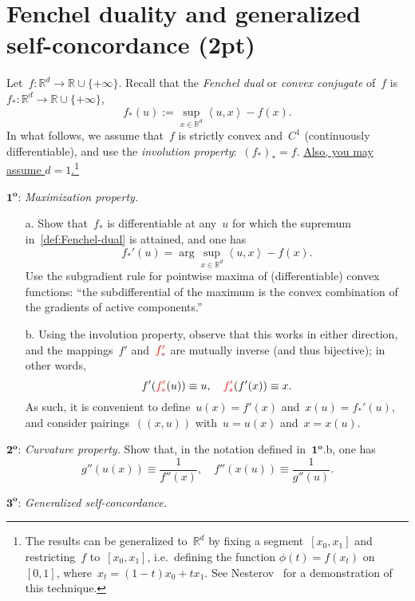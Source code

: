 \documentclass[11pt]{article}
\newcommand{\proofstep}[1]{$\boldsymbol{{#1}^o}$}
\newcommand{\odima}[1]{{\color{red} #1}}
\newcommand{\R}{\mathds{R}}
\newcommand{\lang}{\left\langle}
\newcommand{\rang}{\right\rangle}
\begin{document}
\section{Fenchel duality and generalized self-concordance (2pt)}
Let~$f: \R^d \to \R \cup \{+\infty\}$. 
Recall that the {\em Fenchel dual} or {\em convex conjugate} of~$f$ is~$f_*: \R^d \to \R \cup \{+\infty\}$,
\begin{equation}
\label{def:Fenchel-dual}
f_*(u) := \sup_{x \in \R^d} \lang u, x \rang - f(x).
\end{equation}
In what follows, we assume that~$f$ is \odima{strictly} convex \odima{and~$C^1$ (continuously differentiable)}, and use the {\em involution property}:~$(f_*)_* = f$. 
\underline{Also, you may assume $d = 1$.}\footnote{The results can be generalized to~$\R^d$ by fixing a segment~$[x_0, x_1]$ and restricting~$f$ to~$[x_0, x_1]$, i.e.~defining the function
$
\phi(t) = f(x_t)
$
on~$[0,1]$, where~$x_t = (1-t)x_0 + t x_1.$ See Nesterov~\cite{nesterov2013introductory} for a demonstration of this technique.}

\noindent
\proofstep{1}: {\em Maximization property.}
\begin{itemize}
\item[a.] Show that~$f_*$ is differentiable at any~$u$ for which the supremum in~\eqref{def:Fenchel-dual} is attained, and one has
\[
f_*'(u) = \arg\sup_{x \in \R^d} \lang u, x \rang - f(x).
\]
Use the subgradient rule for pointwise maxima of (differentiable) convex functions: ``the subdifferential of the maximum is the convex combination of the gradients of active components.''\\
\item[b.]
Using the involution property, observe that this works in either direction, and the mappings~$f'$ and~$\odima{f_*'}$ are mutually inverse (and thus bijective); in other words,
\[
f'(\odima{f_*'}(u)) \equiv u, \quad \odima{f_*'}(f'(x)) \equiv x.
\]
As such, it is convenient to define~$u(x) = f'(x)$ and~$x(u) = f_*'(u)$, and consider pairings~$(( x,u ))$ with~$u = u(x)$ and~$x = x(u)$.


\end{itemize}

\noindent
\proofstep{2}: {\em Curvature property.}
Show that, in the notation defined in~\proofstep{1}.b, one has
\[
g''(u(x))  \equiv \frac{1}{f''(x)}, \quad f''(x(u))  \equiv \frac{1}{g''(u)}.
\]


\noindent
\proofstep{3}: {\em Generalized self-concordance.}
\end{document}

